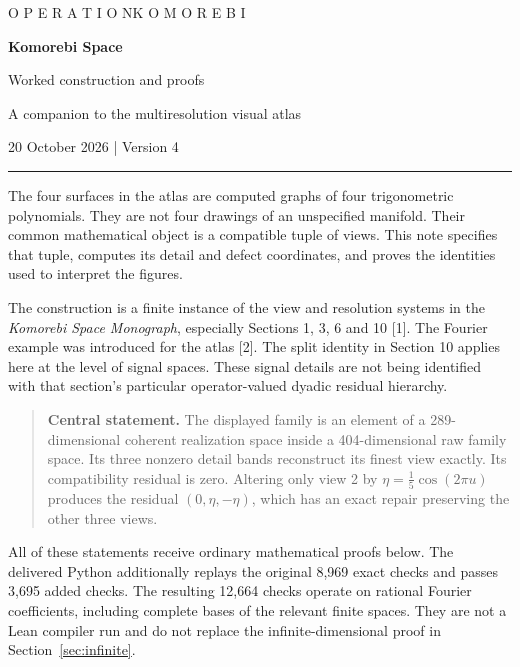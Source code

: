 \documentclass[11pt]{article}
\theoremstyle{definition}
\theoremstyle{remark}
\begin{document}
\thispagestyle{empty}
{\small\sffamily O P E R A T I O N\quad K O M O R E B I}\par
\vspace{8mm}
{\Huge\bfseries Komorebi Space}\par
\vspace{2mm}
{\Large Worked construction and proofs}\par
{\large A companion to the multiresolution visual atlas}\par
\vspace{3mm}
{\small 20 October 2026 \quad | \quad Version 4}\par
\vspace{4mm}\hrule\vspace{5mm}

The four surfaces in the atlas are computed graphs of four trigonometric polynomials. They are not four drawings of an unspecified manifold. Their common mathematical object is a compatible tuple of views. This note specifies that tuple, computes its detail and defect coordinates, and proves the identities used to interpret the figures.

The construction is a finite instance of the view and resolution systems in the \emph{Komorebi Space Monograph}, especially Sections 1, 3, 6 and 10 [1]. The Fourier example was introduced for the atlas [2]. The split identity in Section 10 applies here at the level of signal spaces. These signal details are not being identified with that section's particular operator-valued dyadic residual hierarchy.

\begin{quote}
\textbf{Central statement.} The displayed family is an element of a 289-dimensional coherent realization space inside a 404-dimensional raw family space. Its three nonzero detail bands reconstruct its finest view exactly. Its compatibility residual is zero. Altering only view 2 by $\eta=\tfrac15\cos(2\pi u)$ produces the residual $(0,\eta,-\eta)$, which has an exact repair preserving the other three views.
\end{quote}

All of these statements receive ordinary mathematical proofs below. The delivered Python additionally replays the original 8,969 exact checks and passes 3,695 added checks. The resulting 12,664 checks operate on rational Fourier coefficients, including complete bases of the relevant finite spaces. They are not a Lean compiler run and do not replace the infinite-dimensional proof in Section~\ref{sec:infinite}.
\end{document}
